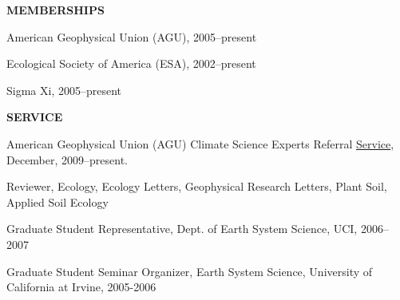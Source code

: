 \documentclass[11pt,twoside]{article}
\begin{document}
\textbf{MEMBERSHIPS}
\vspace{-0.5em}
\begin{itemize*}
\item American Geophysical Union (AGU), 2005--present
\item Ecological Society of America (ESA), 2002--present
\item Sigma Xi, 2005--present
\end{itemize*}


\textbf{SERVICE}
\vspace{-0.5em}
\begin{itemize*}
\item American Geophysical Union (AGU) Climate Science Experts Referral \href{http://www.agu.org/news/press/pr_archives/2010/2010-14.shtml}{Service}, December, 2009--present.
\item Reviewer, Ecology, Ecology Letters, Geophysical Research Letters,  Plant Soil, Applied Soil Ecology %
\item Graduate Student Representative, Dept. of Earth System Science, UCI, 2006--2007
\item Graduate Student Seminar Organizer, Earth System Science, University of California at Irvine, 2005-2006
\end{itemize*}
\end{document}
